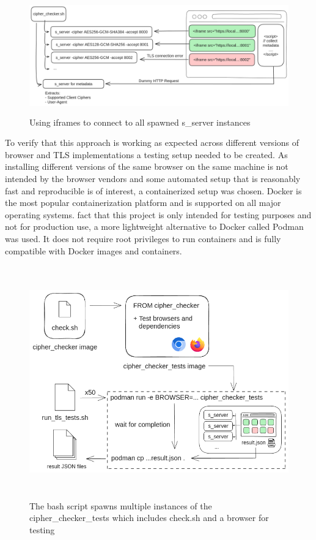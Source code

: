 \documentclass[12pt]{scrbook}
\begin{document}
\begin{figure}
	\centering
	\includegraphics[height=5cm]{./images/cipher_check_setup.png}
	\caption{Using iframes to connect to all spawned s\_server instances}
\end{figure}

\newpage

To verify that this approach is working as expected across different versions of
browser and TLS implementations a testing setup needed to be created.
As installing different versions of the same browser on the same machine is not
intended by the browser vendors and
some automated setup that is reasonably fast and reproducible is of interest, a
containerized setup was chosen.
Docker is the most popular containerization platform and is supported on all
major operating systems.
fact that this project is only intended for testing purposes and not
for production use, a more lightweight alternative
to Docker called Podman was used. It does not require root privileges to run
containers and is fully compatible with Docker images and containers.

\begin{figure}[!h]
	\centering
	\includegraphics[height=10cm]{./images/cipher_checker_tests.png}
	\caption{The bash script spawns multiple instances of the
		cipher\_checker\_tests which includes check.sh and a browser for testing}
\end{figure}
\end{document}
